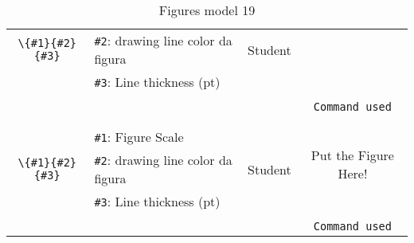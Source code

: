 \documentclass{article}
\begin{document}
\begin{table}[H]
\begin{tabular}{|c|l|c|c|}
\verb|\{#1}{#2}{#3}|                &
\verb|#2|: drawing line color da figura                 &
Student                        &
                                            \\
                                            &
\verb|#3|: Line thickness (pt)                 &
                                            &
                                            \\
                                            &
                                            &
                                            &
                                            \\
                                            &
                                            &
                                            &
\verb|Command used|                    \\
\hline %
                                            & 
                                            & 
                                            &
\multirow{5}{*}{Put the Figure Here!}     \\
                                            &
                                            & 
                                            & 
                                            \\
                                            &
\verb|#1|: Figure Scale                 &
                                            &
                                            \\
\verb|\{#1}{#2}{#3}|                &
\verb|#2|: drawing line color da figura                 &
Student                        &
                                            \\
                                            &
\verb|#3|: Line thickness (pt)                 &
                                            &
                                            \\
                                            &
                                            &
                                            &
                                            \\
                                            &
                                            &
                                            &
\verb|Command used|                    \\
\hline
    \end{tabular}
    \caption{Figures model 19}
    \label{tab19}
\end{table}
\end{document}

